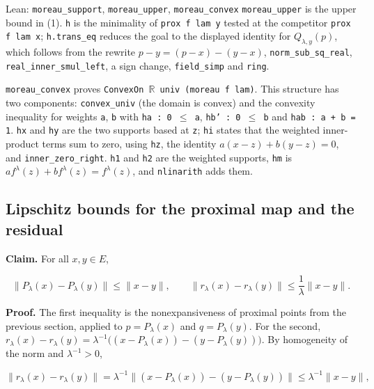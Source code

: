 \documentclass[11pt,a4paper]{report}
\begin{document}
\begin{leanbox}{Lean: \texttt{moreau\_\allowbreak{}support}, \texttt{moreau\_\allowbreak{}upper}, \texttt{moreau\_\allowbreak{}convex}}
\texttt{moreau\_\allowbreak{}upper} is the upper bound in (1). \texttt{h} is the minimality of \texttt{prox f lam y} tested at the competitor \texttt{prox f lam x}; \texttt{h.\allowbreak{}trans\_\allowbreak{}eq} reduces the goal to the displayed identity for \(Q_{\lambda,y}(p)\), which follows from the rewrite \(p-y=(p-x)-(y-x)\), \texttt{norm\_\allowbreak{}sub\_\allowbreak{}sq\_\allowbreak{}real}, \texttt{real\_\allowbreak{}inner\_\allowbreak{}smul\_\allowbreak{}left}, a sign change, \texttt{field\_\allowbreak{}simp} and \texttt{ring}.




\texttt{moreau\_\allowbreak{}convex} proves \texttt{Convex\allowbreak{}On \ensuremath{\mathbb R} univ (moreau f lam)}. This structure has two components: \texttt{convex\_\allowbreak{}univ} (the domain is convex) and the convexity inequality for weights \texttt{a}, \texttt{b} with \texttt{ha : 0 \ensuremath{\le} a}, \texttt{hb' : 0 \ensuremath{\le} b} and \texttt{hab : a + b = 1}. \texttt{hx} and \texttt{hy} are the two supports based at \texttt{z}; \texttt{hi} states that the weighted inner-product terms sum to zero, using \texttt{hz}, the identity \(a(x-z)+b(y-z)=0\), and \texttt{inner\_\allowbreak{}zero\_\allowbreak{}right}. \texttt{h1} and \texttt{h2} are the weighted supports, \texttt{hm} is \(af^\lambda(z)+bf^\lambda(z)=f^\lambda(z)\), and \texttt{nlinarith} adds them.
\end{leanbox}
\subsection{\texorpdfstring{Lipschitz bounds for the proximal map and the residual}{Lipschitz bounds for the proximal map and the residual}}
\label{report-step-ProximalLangevin-Moreau-lean-3}


\textbf{Claim.} For all \(x,y\in E\),


\[\|P_\lambda(x)-P_\lambda(y)\|\le\|x-y\|,\qquad\|r_\lambda(x)-r_\lambda(y)\|\le\frac1\lambda\|x-y\|.\]


\textbf{Proof.} The first inequality is the nonexpansiveness of proximal points from the previous section, applied to \(p=P_\lambda(x)\) and \(q=P_\lambda(y)\). For the second, \(r_\lambda(x)-r_\lambda(y)=\lambda^{-1}\bigl((x-P_\lambda(x))-(y-P_\lambda(y))\bigr)\). By homogeneity of the norm and \(\lambda^{-1}>0\),


\[\|r_\lambda(x)-r_\lambda(y)\|=\lambda^{-1}\bigl\|(x-P_\lambda(x))-(y-P_\lambda(y))\bigr\|\le\lambda^{-1}\|x-y\|,\]
\end{document}
